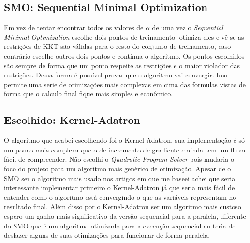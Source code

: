 \subsection{SMO: Sequential Minimal Optimization}
Em vez de tentar encontrar todos os valores de $\alpha$ de uma vez o \emph{Sequential Minimal Optimization} escolhe dois pontos de treinamento, otimiza eles e vê se as restrições de KKT são válidas para o resto do conjunto de treinamento, caso contrário escolhe outros dois pontos e continua o algoritmo. Os pontos escolhidos são sempre de forma que um ponto respeite as restrições e o maior violador das restrições. Dessa forma é possível provar que o algoritmo vai convergir. Isso permite uma serie de otimizações mais complexas em cima das formulas vistas de forma que o calculo final fique mais simples e econômico.


\subsection{Escolhido: Kernel-Adatron}
O algoritmo que acabei escolhendo foi o Kernel-Adatron, sua implementação é só um pouco mais complexa que o de incremento de gradiente e ainda tem um fluxo fácil de compreender. Não escolhi o \emph{Quadratic Program Solver} pois mudaria o foco do projeto para um algoritmo mais genérico de otimização. Apesar de o SMO ser o algoritmo mais usado nos artigos em que me baseei achei que seria interessante implementar primeiro o Kernel-Adatron já que seria mais fácil de entender como o algoritmo está convergindo o que as variáveis representam no resultado final. Além disso por o Kernel-Adatron ser um algoritmo mais custoso espero um ganho mais significativo da versão sequencial para a paralela, diferente do SMO que é um algoritmo otimizado para a execução sequencial eu teria de desfazer alguns de suas otimizações para funcionar de forma paralela.